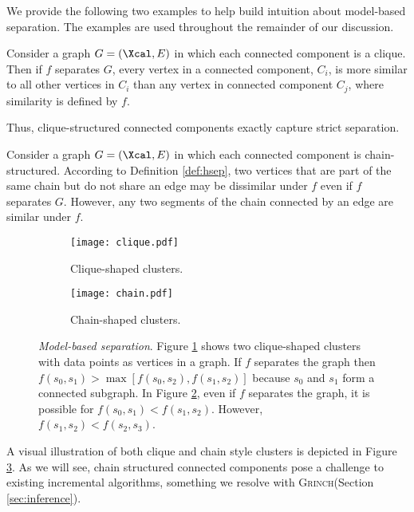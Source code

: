 \documentclass{article} \usepackage[utf8]{inputenc} \usepackage[T1]{fontenc}    \usepackage{hyperref}       \usepackage{url}            \usepackage{booktabs}       \usepackage{amsfonts}       \usepackage{nicefrac}       \usepackage{microtype}      \usepackage{geometry}
\newcommand{\alg}{\textsc{Grinch}\xspace}
\newcommand{\records}{data points\xspace}
\begin{document}
We provide the following two examples to help build intuition about
model-based separation. The examples are used throughout the remainder
of our discussion.

\begin{example}[Clique]
  \label{ex:clique}
  Consider a graph $G=(\Xcal, E)$ in which each connected component is
  a clique.  Then if $f$ separates $G$, every vertex in a connected
  component, $C_i$, is more similar to all other vertices in $C_i$
  than any vertex in connected component $C_j$, where similarity is
  defined by $f$.
\end{example}
\noindent Thus, clique-structured connected components exactly capture strict
separation.

\begin{example}[Chain]
  \label{ex:chain}
  Consider a graph $G=(\Xcal, E)$ in which each connected component is
  chain-structured.  According to Definition \ref{def:hsep}, two
  vertices that are part of the same chain but do not share an edge
  may be dissimilar under $f$ even if $f$ separates $G$. However,
  any two segments of the chain connected by an edge are
  similar under $f$.
\end{example}
\begin{figure}[t]
  \captionsetup[subfigure]{justification=centering}
  \centering
  \begin{subfigure}[h]{0.4\columnwidth}
  \centerline{\texttt{[image: clique.pdf]}}
  \caption{Clique-shaped clusters.}
  \label{fig:clique-ex}
\end{subfigure}
\begin{subfigure}[h]{0.4\columnwidth}
  \centerline{\texttt{[image: chain.pdf]}}
  \caption{Chain-shaped clusters.}
  \label{fig:chain-ex}
\end{subfigure}
\caption{\emph{Model-based separation}. Figure \ref{fig:clique-ex}
  shows two clique-shaped clusters with \records as vertices in a
  graph. If $f$ separates the graph then
  $f(s_0, s_1) > \max[f(s_0, s_2), f(s_1, s_2)]$ because $s_0$ and
  $s_1$ form a connected subgraph. In Figure \ref{fig:chain-ex}, even if
  $f$ separates the graph, it is possible for
  $f(s_0, s_1) < f(s_1, s_2)$. However, $f(s_1, s_2) < f(s_2, s_3)$.}
  \label{fig:clique-and-chain}
\end{figure}
 \noindent A visual illustration of both clique and chain style clusters is
depicted in Figure \ref{fig:clique-and-chain}. As we will see, chain
structured connected components pose a challenge to existing
incremental algorithms, something we resolve with \alg (Section \ref{sec:inference}).
\end{document}
